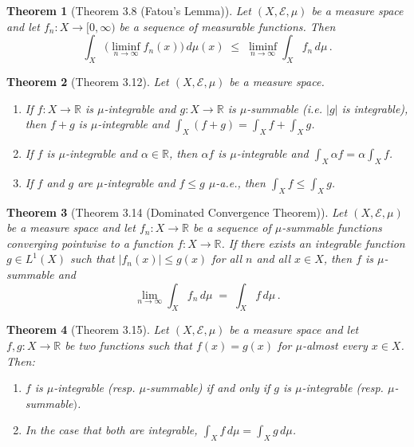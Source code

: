 \documentclass{article}
\theoremstyle{plain}
\newtheorem*{theorem*}{Theorem}
\begin{document}
\begin{theorem*}[Theorem 3.8 (Fatou’s Lemma)]
Let $(X, \mathcal{E}, \mu)$ be a measure space and let $f_n: X \to [0,\infty)$ be a sequence of measurable functions. Then 
\[
\int_X \Big(\liminf_{n\to\infty} f_n(x)\Big)\,d\mu(x) \;\le\; \liminf_{n\to\infty} \int_X f_n\,d\mu\,.
\]
\end{theorem*}

\begin{theorem*}[Theorem 3.12]
Let $(X, \mathcal{E}, \mu)$ be a measure space. 
\begin{enumerate}
\item If $f: X \to \mathbb{R}$ is $\mu$-integrable and $g: X \to \mathbb{R}$ is $\mu$-summable (i.e. $|g|$ is integrable), then $f+g$ is $\mu$-integrable and $\displaystyle\int_X (f+g) = \int_X f + \int_X g$.
\item If $f$ is $\mu$-integrable and $\alpha \in \mathbb{R}$, then $\alpha f$ is $\mu$-integrable and $\displaystyle \int_X \alpha f = \alpha \int_X f$.
\item If $f$ and $g$ are $\mu$-integrable and $f \le g$ $\mu$-a.e., then $\displaystyle \int_X f \le \int_X g$.
\end{enumerate}
\end{theorem*}

\begin{theorem*}[Theorem 3.14 (Dominated Convergence Theorem)]
Let $(X, \mathcal{E}, \mu)$ be a measure space and let $f_n: X \to \mathbb{R}$ be a sequence of $\mu$-summable functions converging pointwise to a function $f: X \to \mathbb{R}$. If there exists an integrable function $g \in L^1(X)$ such that $|f_n(x)| \le g(x)$ for all $n$ and all $x\in X$, then $f$ is $\mu$-summable and 
\[
\lim_{n\to\infty}\int_X f_n\,d\mu \;=\; \int_X f\,d\mu\,.
\] 
\end{theorem*}

\begin{theorem*}[Theorem 3.15]
Let $(X, \mathcal{E}, \mu)$ be a measure space and let $f, g: X \to \mathbb{R}$ be two functions such that $f(x) = g(x)$ for $\mu$-almost every $x \in X$. Then:
\begin{enumerate}
\item $f$ is $\mu$-integrable (resp. $\mu$-summable) if and only if $g$ is $\mu$-integrable (resp. $\mu$-summable$)$.
\item In the case that both are integrable, $\displaystyle \int_X f\,d\mu = \int_X g\,d\mu$.
\end{enumerate}
\end{theorem*}
\end{document}
